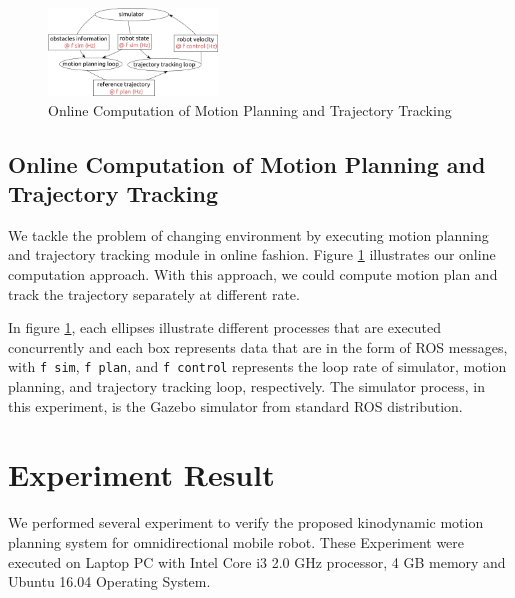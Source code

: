 \documentclass[conference]{IEEEtran}
\newcommand{\vars}{\texttt}
\begin{document}
\begin{figure}[ht!]
	\centering
	\includegraphics[width=0.4\textwidth]{assets/online_loop}
	\caption{Online Computation of Motion Planning and Trajectory Tracking}
	\label{online_loop}
\end{figure}

\subsection{Online Computation of Motion Planning and Trajectory Tracking}

We tackle the problem of changing environment by executing motion planning and trajectory tracking module in online fashion. Figure \ref{online_loop} illustrates our online computation approach. With this approach, we could compute motion plan and track the trajectory separately at different rate.

In figure \ref{online_loop}, each ellipses illustrate different processes that are executed concurrently and each box represents data that are in the form of ROS messages, with \vars{f sim}, \vars{f plan}, and \vars{f control} represents the loop rate of simulator, motion planning, and trajectory tracking loop, respectively. The simulator process, in this experiment, is the Gazebo simulator from standard ROS distribution.

\section{Experiment Result} \label{result}

We performed several experiment to verify the proposed kinodynamic motion planning system for omnidirectional mobile robot. These Experiment were executed on Laptop PC with Intel Core i3 2.0 GHz processor, 4 GB memory and Ubuntu 16.04 Operating System.
\end{document}
